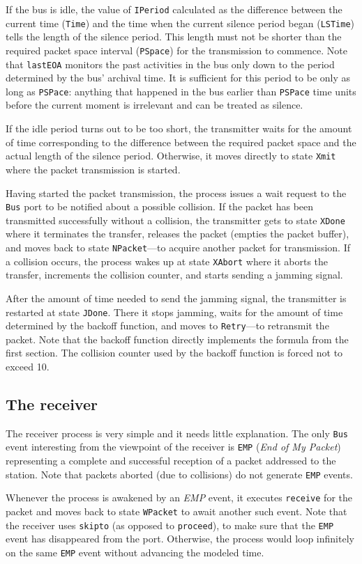 If the bus is idle, the value of {\tt IPeriod} calculated as the difference
between the current time ({\tt Time}) and the time when the current silence
period began ({\tt LSTime}) tells the length of the silence period.
This length must not be shorter than the required packet space interval
({\tt PSpace}) for the transmission to commence.
Note that {\tt lastEOA} monitors the past activities in the bus only down
to the period determined by the bus' archival time.
It is sufficient for this period to be only as long as {\tt PSPace}:
anything that happened in the bus earlier than {\tt PSPace} time units
before the current moment is irrelevant and can be treated as silence.

If the idle period turns out to be too short, the transmitter waits for
the amount of time corresponding to the difference between the required
packet space and the actual length of the silence period.
Otherwise, it moves directly
to state {\tt Xmit} where the packet transmission is started.

Having started the packet transmission, the process issues a wait request
to the {\tt Bus} port to be notified about a possible collision.
If the packet has been transmitted successfully without a collision,
the transmitter gets to state {\tt XDone} where it terminates the
transfer, releases the packet (empties the packet buffer), and moves
back to state {\tt NPacket}---to acquire another packet for transmission.
If a collision occurs, the process wakes up at state {\tt XAbort} where
it aborts the transfer, increments the collision counter, and starts
sending a jamming signal.

After the amount of time needed to send the jamming signal, the transmitter
is restarted at state {\tt JDone}.
There it stops jamming, waits for the amount of time determined by the
backoff function, and moves to {\tt Retry}---to retransmit the packet.
Note that the backoff function directly implements the formula from the
first section.
The collision counter used by the backoff function is forced not to exceed
10.

\subsection{The receiver}

The receiver process is very simple and it needs little explanation.
The only {\tt Bus} event interesting from the viewpoint of the receiver
is {\tt EMP} ({\em End of My Packet\/}) representing a complete and
successful reception of a packet addressed to the station.
Note that packets aborted (due to collisions) do not generate {\tt EMP}
events.

Whenever the process is awakened by an {\em EMP} event, it executes
{\tt receive} for the packet and moves back to state
{\tt WPacket} to await another such event.
Note that the receiver uses {\tt skipto} (as opposed to {\tt proceed}),
to make sure that the {\tt EMP} event has disappeared from the port.
Otherwise, the process would loop infinitely on the same {\tt EMP}
event without advancing the modeled time.


